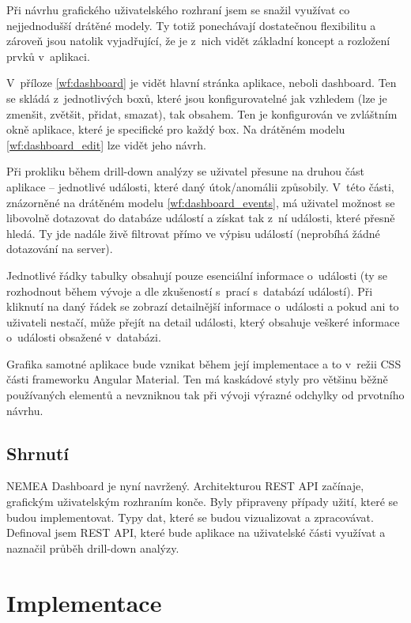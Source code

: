 Při návrhu grafického uživatelského rozhraní jsem se snažil využívat co nejjednodušší drátěné modely. Ty totiž ponechávají dostatečnou flexibilitu a zároveň jsou natolik vyjadřující, že je z~nich vidět základní koncept a rozložení prvků v~aplikaci.

V~příloze \ref{wf:dashboard} je vidět hlavní stránka aplikace, neboli dashboard. Ten se skládá z~jednotlivých boxů, které jsou konfigurovatelné jak vzhledem (lze je zmenšit, zvětšit, přidat, smazat), tak obsahem. Ten je konfigurován ve zvláštním okně aplikace, které je specifické pro každý box. Na drátěném modelu \ref{wf:dashboard_edit} lze vidět jeho návrh.

Při prokliku během drill-down analýzy se uživatel přesune na druhou část aplikace -- jednotlivé události, které daný útok/anomálii způsobily. V~této části, znázorněné na drátěném modelu \ref{wf:dashboard_events}, má uživatel možnost se libovolně dotazovat do databáze událostí a získat tak z~ní události, které přesně hledá. Ty jde nadále živě filtrovat přímo ve výpisu událostí (neprobíhá žádné dotazování na server).

Jednotlivé řádky tabulky obsahují pouze esenciální informace o~události (ty se rozhodnout během vývoje a dle zkušeností s~prací s~databází událostí). Při kliknutí na daný řádek se zobrazí detailnější informace o~události a pokud ani to uživateli nestačí, může přejít na detail události, který obsahuje veškeré informace o~události obsažené v~databázi.

Grafika samotné aplikace bude vznikat během její implementace a to v~režii CSS části frameworku Angular Material. Ten má kaskádové styly pro většinu běžně používaných elementů a nevzniknou tak při vývoji výrazné odchylky od prvotního návrhu.

\section{Shrnutí}

NEMEA Dashboard je nyní navržený. Architekturou REST API začínaje, grafickým uživatelským rozhraním konče. Byly připraveny případy užití, které se budou implementovat. Typy dat, které se budou vizualizovat a zpracovávat. Definoval jsem REST API, které bude aplikace na uživatelské části využívat a naznačil průběh drill-down analýzy.

\chapter{Implementace}

